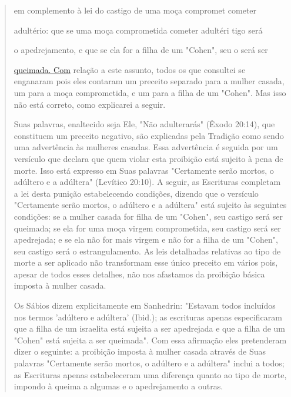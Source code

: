 \begin{quote}em complemento à lei do castigo de uma moça compromet cometer

adultério: que se uma moça comprometida cometer adultéri tigo será

o apedrejamento, e que se ela for a filha de um "Cohen", seu o será ser

\href{http://queimada.Com}{{queimada. Com}} relação a este assunto,
todos os que consultei se enganaram pois eles contaram um preceito
separado para a mulher casada, um para a moça comprometida, e um para a
filha de um "Cohen". Mas isso não está correto, como explicarei a
seguir.

Suas palavras, enaltecido seja Ele, "Não adulterarás" (Êxodo 20:14), que
constituem um preceito negativo, são explicadas pela Tradição como
sen­do uma advertência às mulheres casadas. Essa advertência é seguida
por um versículo que declara que quem violar esta proibição está sujeito
à pena de morte. Isso está expresso em Suas palavras "Certamente serão
mortos, o adúltero e a adúltera" (Levítico 20:10). A seguir, as
Escrituras completam a lei desta puni­ção estabelecendo condições,
dizendo que o versículo "Certamente serão mor­tos, o adúltero e a
adúltera" está sujeito às seguintes condições: se a mulher casada for
filha de um "Cohen", seu castigo será ser queimada; se ela for uma moça
virgem comprometida, seu castigo será ser apedrejada; e se ela não for
mais virgem e não for a filha de um "Cohen", seu castigo será o
estrangulamen­to. As leis detalhadas relativas ao tipo de morte a ser
aplicado não transformam esse único preceito em vários pois, apesar de
todos esses detalhes, não nos afas­tamos da proibição básica imposta à
mulher casada.

Os Sábios dizem explicitamente em Sanhedrin: "Estavam todos in­cluídos
nos termos 'adúltero e adúltera' (Ibid.); as escrituras apenas
especifica­ram que a filha de um israelita está sujeita a ser apedrejada
e que a filha de um "Cohen" está sujeita a ser queimada". Com essa
afirmação eles pretenderam dizer o seguinte: a proibição imposta à
mulher casada através de Suas palavras "Certamente serão mortos, o
adúltero e a adúltera" inclui a todos; as Escrituras apenas
estabeleceram uma diferença quanto ao tipo de morte, impondo à quei­ma a
algumas e o apedrejamento a outras.


\end{quote}
